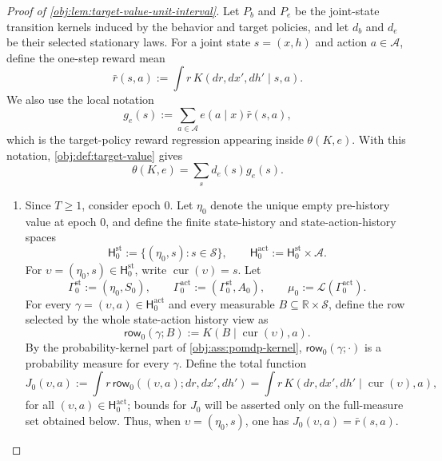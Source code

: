 \begin{proof}[Proof of \cref{obj:lem:target-value-unit-interval}]
Let \(P_b\) and \(P_e\) be the joint-state transition kernels induced by the behavior and target policies, and let \(d_b\) and \(d_e\) be their selected stationary laws. For a joint state \(s=(x,h)\) and action \(a\in\mathcal A\), define the one-step reward mean
\[
\bar r(s,a)
:=
\int r\,K(d r,d x',d h'\mid s,a).
\]
We also use the local notation
\[
g_e(s)
:=
\sum_{a\in\mathcal A} e(a\mid x)\bar r(s,a),
\]
which is the target-policy reward regression appearing inside \(\theta(K,e)\). With this notation, \cref{obj:def:target-value} gives
\[
\theta(K,e)=\sum_s d_e(s)g_e(s).
\]

\begin{enumerate}
\item Since \(T\ge1\), consider epoch \(0\). Let \(\eta_0\) denote the unique empty pre-history value at epoch \(0\), and define the finite state-history and state-action-history spaces
\[
\mathsf H^{\mathrm{st}}_0
:=
\{(\eta_0,s):s\in\mathcal S\},
\qquad
\mathsf H^{\mathrm{act}}_0
:=
\mathsf H^{\mathrm{st}}_0\times\mathcal A.
\]
For \(\upsilon=(\eta_0,s)\in\mathsf H^{\mathrm{st}}_0\), write \(\operatorname{cur}(\upsilon)=s\). Let
\[
\Gamma^{\mathrm{st}}_0:=(\eta_0,S_0),
\qquad
\Gamma^{\mathrm{act}}_0:=(\Gamma^{\mathrm{st}}_0,A_0),
\qquad
\mu_0:=\mathcal L(\Gamma^{\mathrm{act}}_0).
\]
For every \(\gamma=(\upsilon,a)\in\mathsf H^{\mathrm{act}}_0\) and every measurable \(B\subseteq\mathbb R\times\mathcal S\), define the row selected by the whole state-action history view as
\[
\mathsf{row}_0(\gamma;B)
:=
K(B\mid \operatorname{cur}(\upsilon),a).
\]
By the probability-kernel part of \cref{obj:ass:pomdp-kernel}, \(\mathsf{row}_0(\gamma;\cdot)\) is a probability measure for every \(\gamma\). Define the total function
\[
J_0(\upsilon,a)
:=
\int r\,\mathsf{row}_0((\upsilon,a);d r,d x',d h')
=
\int r\,K(d r,d x',d h'\mid \operatorname{cur}(\upsilon),a),
\]
for all \((\upsilon,a)\in\mathsf H^{\mathrm{act}}_0\); bounds for \(J_0\) will be asserted only on the full-measure set obtained below. Thus, when \(\upsilon=(\eta_0,s)\), one has \(J_0(\upsilon,a)=\bar r(s,a)\).


\end{enumerate}
\end{proof}
